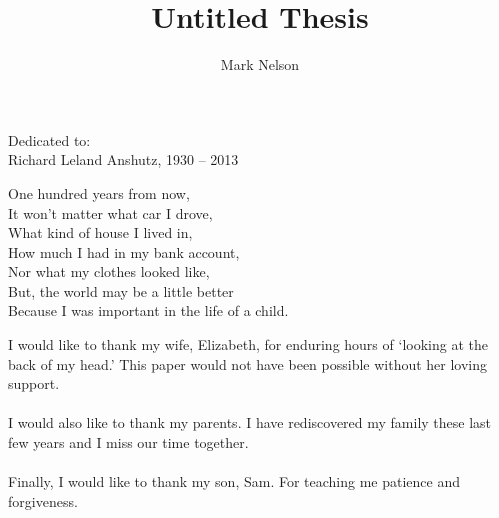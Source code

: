 \documentclass[11pt]{../uhthesis}
\title{Untitled Thesis}
\author{Mark Nelson}
\begin{document}
\maketitle

\begin{frontmatter}


\copyrightpage

\begin{dedication}
\null\vfil
{\large
\begin{center}
Dedicated to: \\\vspace{12pt}
Richard Leland Anshutz, 1930 -- 2013\\\vspace{12pt}

One hundred years from now, \\
It won't matter what car I drove, \\
What kind of house I lived in, \\
How much I had in my bank account, \\
Nor what my clothes looked like, \\
But, the world may be a little better \\
Because I was important in the life of a child. \\

\end{center}}
\vfil\null
\end{dedication}


\begin{acknowledgments}
I would like to thank my wife, Elizabeth, for enduring hours of `looking at the back of my head.'  This paper would not have been possible without her loving support.  \\
\\
I would also like to thank my parents.  I have rediscovered my family these last few years and I miss our time together.  \\
\\
Finally, I would like to thank my son, Sam.  For teaching me patience and forgiveness.


\end{acknowledgments}




\begin{abstract}


\end{abstract}
\end{frontmatter}
\end{document}
